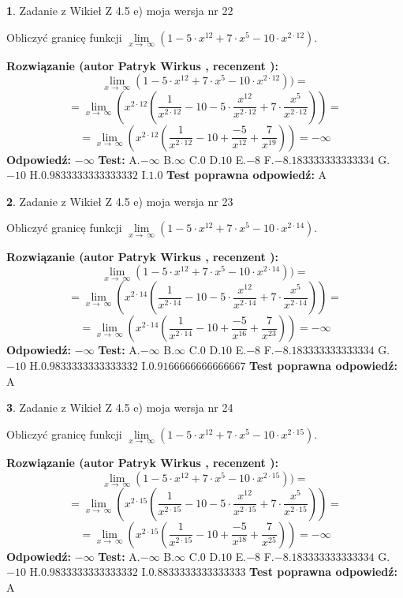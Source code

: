 \documentclass[12pt, a4paper]{article}
\theoremstyle{definition} %
\newtheorem{zad}{}
\newcommand{\zadStart}[1]{\begin{zad}#1\newline}
\newcommand{\zadStop}{\end{zad}}
\newcommand{\rozwStart}[2]{\noindent \textbf{Rozwiązanie (autor #1 , recenzent #2): }\newline}
\newcommand{\rozwStop}{\newline}
\newcommand{\odpStart}{\noindent \textbf{Odpowiedź:}\newline}
\newcommand{\odpStop}{\newline}
\newcommand{\testStart}{\noindent \textbf{Test:}\newline}
\newcommand{\testStop}{\newline}
\newcommand{\kluczStart}{\noindent \textbf{Test poprawna odpowiedź:}\newline}
\newcommand{\kluczStop}{\newline}
\begin{document}
\zadStart{Zadanie z Wikieł Z 4.5 e) moja wersja nr 22}


Obliczyć granicę funkcji  $\lim\limits_{x\to\ \infty}(1 - 5 \cdot x^{12}+7 \cdot x^{5}- 10 \cdot x^{2\cdot12})$.
\zadStop
\rozwStart{Patryk Wirkus}{}
$$\lim\limits_{x\to\ \infty}(1 - 5 \cdot x^{12}+7 \cdot x^{5}- 10 \cdot x^{2\cdot12}))=$$
$$=\lim\limits_{x\to\ \infty}(x^{2\cdot12}(\frac{1}{x^{2\cdot12}}-10 -5 \cdot \frac{x^{12}}{x^{2\cdot12}}+7 \cdot \frac{x^{5}}{x^{2\cdot12}}))=$$
$$=\lim\limits_{x\to\ \infty}(x^{2\cdot12}(\frac{1}{x^{2\cdot12}}-10 + \frac{-5}{x^{12}}+ \frac{7}{x^{19}}))=-\infty$$
\rozwStop
\odpStart
$-\infty$
\odpStop
\testStart
A.$-\infty$ B.$\infty$ C.$0$ D.$10$ E.$-8$
F.$-8.183333333333334$ G.$-10$
H.$0.9833333333333332$
I.$1.0$
\testStop
\kluczStart
A
\kluczStop



\zadStart{Zadanie z Wikieł Z 4.5 e) moja wersja nr 23}


Obliczyć granicę funkcji  $\lim\limits_{x\to\ \infty}(1 - 5 \cdot x^{12}+7 \cdot x^{5}- 10 \cdot x^{2\cdot14})$.
\zadStop
\rozwStart{Patryk Wirkus}{}
$$\lim\limits_{x\to\ \infty}(1 - 5 \cdot x^{12}+7 \cdot x^{5}- 10 \cdot x^{2\cdot14}))=$$
$$=\lim\limits_{x\to\ \infty}(x^{2\cdot14}(\frac{1}{x^{2\cdot14}}-10 -5 \cdot \frac{x^{12}}{x^{2\cdot14}}+7 \cdot \frac{x^{5}}{x^{2\cdot14}}))=$$
$$=\lim\limits_{x\to\ \infty}(x^{2\cdot14}(\frac{1}{x^{2\cdot14}}-10 + \frac{-5}{x^{16}}+ \frac{7}{x^{23}}))=-\infty$$
\rozwStop
\odpStart
$-\infty$
\odpStop
\testStart
A.$-\infty$ B.$\infty$ C.$0$ D.$10$ E.$-8$
F.$-8.183333333333334$ G.$-10$
H.$0.9833333333333332$
I.$0.9166666666666667$
\testStop
\kluczStart
A
\kluczStop



\zadStart{Zadanie z Wikieł Z 4.5 e) moja wersja nr 24}


Obliczyć granicę funkcji  $\lim\limits_{x\to\ \infty}(1 - 5 \cdot x^{12}+7 \cdot x^{5}- 10 \cdot x^{2\cdot15})$.
\zadStop
\rozwStart{Patryk Wirkus}{}
$$\lim\limits_{x\to\ \infty}(1 - 5 \cdot x^{12}+7 \cdot x^{5}- 10 \cdot x^{2\cdot15}))=$$
$$=\lim\limits_{x\to\ \infty}(x^{2\cdot15}(\frac{1}{x^{2\cdot15}}-10 -5 \cdot \frac{x^{12}}{x^{2\cdot15}}+7 \cdot \frac{x^{5}}{x^{2\cdot15}}))=$$
$$=\lim\limits_{x\to\ \infty}(x^{2\cdot15}(\frac{1}{x^{2\cdot15}}-10 + \frac{-5}{x^{18}}+ \frac{7}{x^{25}}))=-\infty$$
\rozwStop
\odpStart
$-\infty$
\odpStop
\testStart
A.$-\infty$ B.$\infty$ C.$0$ D.$10$ E.$-8$
F.$-8.183333333333334$ G.$-10$
H.$0.9833333333333332$
I.$0.8833333333333333$
\testStop
\kluczStart
A
\kluczStop
\end{document}
